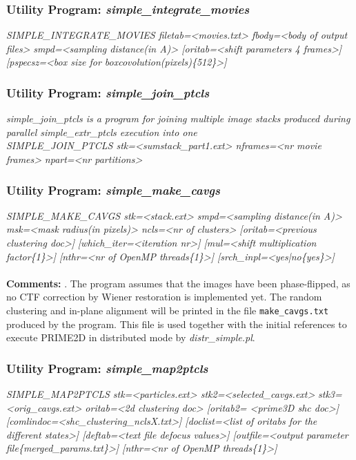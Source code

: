 \documentclass[review]{elsarticle}
\begin{document}
{{\subsubsection{Utility Program: {\it{simple\_integrate\_movies}}}
\label{integrate_movies}
{\it{SIMPLE\_INTEGRATE\_MOVIES filetab=<movies.txt> fbody=<body of output files>}}
{\it{smpd=<sampling distance(in A)> [oritab=<shift parameters 4 frames>]}}
{\it{[pspecsz=<box size for boxcovolution(pixels)\{512\}>]}}

\subsubsection{Utility Program: {\it{simple\_join\_ptcls}}}
\label{join_ptcls}
{\it{simple\_join\_ptcls} is a program for joining multiple image stacks produced during parallel simple\_extr\_ptcls execution into one}\\
{\it{SIMPLE\_JOIN\_PTCLS stk=<sumstack\_part1.ext> nframes=<nr movie frames>}}
{\it{npart=<nr partitions>}}

\subsubsection{Utility Program: {\it{simple\_make\_cavgs}}}
\label{make_cavgs}
{\it{SIMPLE\_MAKE\_CAVGS stk=<stack.ext> smpd=<sampling distance(in A)> msk=<mask}}
{\it{radius(in pixels)> ncls=<nr of clusters> [oritab=<previous clustering doc>]}}
{\it{[which\_iter=<iteration nr>] [mul=<shift multiplication factor\{1\}>] [nthr=<nr}}
{\it{of OpenMP threads\{1\}>] [srch\_inpl=<yes|no\{yes\}>]}}
\\\\
\noindent\textbf{Comments:} . The program assumes that the images have been phase-flipped, as no CTF correction by Wiener restoration is implemented yet. The random clustering and in-plane alignment will be printed in the file \texttt{make\_cavgs.txt} produced by the program. This file is used together with the initial references to execute PRIME2D in distributed mode by {\it{distr\_simple.pl}}.

\subsubsection{Utility Program: {\it{simple\_map2ptcls}}}
\label{map2ptcls}
{\it{SIMPLE\_MAP2PTCLS stk=<particles.ext> stk2=<selected\_cavgs.ext>}}
{\it{stk3=<orig\_cavgs.ext> oritab=<2d clustering doc> [oritab2= <prime3D shc doc>]}}
{\it{[comlindoc=<shc\_clustering\_nclsX.txt>] [doclist=<list of oritabs for the}}
{\it{different states>] [deftab=<text file defocus values>] [outfile=<output}}
{\it{parameter file\{merged\_params.txt\}>] [nthr=<nr of OpenMP threads\{1\}>]}}

}}
\end{document}
